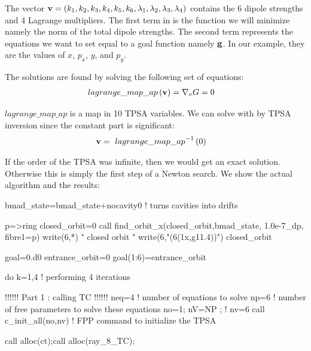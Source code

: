 \documentclass{hitec}     %
\begin{document}
{{The vector ${\bf v}=(k_1,k_2,k_3,k_4,k_5,k_6,{\lambda }_{1},{\lambda }_{2},{\lambda }_{3},{\lambda }_{4})$ contains the 6 dipole strengths and 4 Lagrange multipliers.  The first term in  is the function we will minimize namely the norm of the total dipole strengths. The second term represents the equations we want to set equal to a goal function namely $\bf g$. In our example, they are the values of $x$, $p_x$, $y$, and $p_y$.


The solutions are found by solving the   following set of equations:
%
\begin{align} lagrange\_map\_ap\left({{ \bf v }}\right)&={\nabla }_{v}G=
0 \label{eq:newt}\end{align}

$lagrange\_map\_ap$ is a map in 10 TPSA variables. We can solve with by TPSA inversion since the constant part is significant:
%
\begin{align} { \bf v }&=\ {lagrange\_map\_ap}^{-1}\left({0}\right) \label{eq:newts}\end{align}

If the order of the TPSA was infinite, then we would get an exact solution. Otherwise this is simply the first step of a Newton search. We show the actual algorithm and the results:

\begin{code}
bmad_state=bmad_state+nocavity0 ! turns cavities into drifts

p=>ring%
closed_orbit=0
call find_orbit_x(closed_orbit,bmad_state, 1.0e-7_dp, fibre1=p)
write(6,*) " closed orbit "
write(6,"(6(1x,g11.4))") closed_orbit
 
 goal=0.d0
entrance_orbit=0
goal(1:6)=entrance_orbit

do k=1,4    ! performing 4 iterations

   !!!!!! Part 1 : calling TC !!!!!!
   neq=4    ! number of equations to solve
   np=6     ! number of free parameters to solve these equations
   no=1; nV=NP ;  ! nv=6 
   call c_init_all(no,nv)   ! FPP command to initialize the TPSA
    
   call alloc(ct);call alloc(ray_8_TC);
   

\end{code}}}
\end{document}
